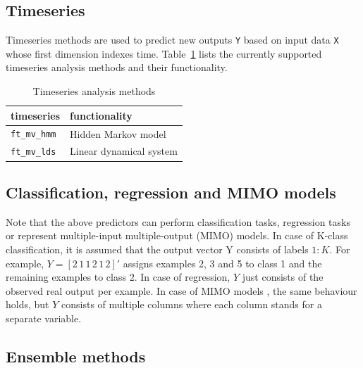 \documentclass{article}
\renewcommand{\t}[1]{{\tt #1}}
\begin{document}
\subsection{Timeseries}

Timeseries methods are used to predict new outputs \t{Y} based on input data \t{X} whose first dimension indexes time. Table~\ref{timeseries} lists the currently supported timeseries analysis methods and their functionality.

\begin{table}[ht]
\centering
\caption{Timeseries analysis methods}
\begin{tabular}{p{}|p{}}
\bf{timeseries} & \bf{functionality}\\
\hline
\t{ft\_mv\_hmm} & Hidden Markov model\\
\t{ft\_mv\_lds} & Linear dynamical system
\end{tabular}
\label{timeseries}
\end{table}

\subsection{Classification, regression and MIMO models}

Note that the above predictors can perform classification tasks, regression tasks or represent multiple-input multiple-output (MIMO) models. In case of K-class classification, it is assumed that the output vector Y consists of labels $1:K$. For example, $Y = [2\,1\, 1\, 2\, 1\, 2]'$ assigns examples 2, 3 and 5 to class 1 and the remaining examples to class 2. In case of regression, $Y$ just consists of the observed real output per example. In case of MIMO models , the same behaviour holds, but $Y$ consists of multiple columns where each column stands for a separate variable.

\subsection{Ensemble methods}
\end{document}

